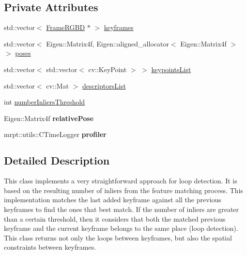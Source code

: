\subsection*{Private Attributes}
\begin{DoxyCompactItemize}
\item 
std::vector$<$ \hyperlink{class_frame_r_g_b_d}{FrameRGBD} $\ast$ $>$ \hyperlink{class_keyframe_loop_detector_a9fc839f91a21d9666dbf40610d2be7df}{keyframes}
\item 
std::vector$<$ Eigen::Matrix4f, Eigen::aligned\_\-allocator$<$ Eigen::Matrix4f $>$ $>$ \hyperlink{class_keyframe_loop_detector_a486f9714c66706b85febede7f3653676}{poses}
\item 
std::vector$<$ std::vector$<$ cv::KeyPoint $>$ $>$ \hyperlink{class_keyframe_loop_detector_aed3185bed2b9c9c1e342d155f370bc60}{keypointsList}
\item 
std::vector$<$ cv::Mat $>$ \hyperlink{class_keyframe_loop_detector_a523e7cacd0a93ce8bc5a55100c571bed}{descriptorsList}
\item 
int \hyperlink{class_keyframe_loop_detector_a88bfa794730e06898b2f9aede72f22ca}{numberInliersThreshold}
\item 
\hypertarget{class_keyframe_loop_detector_a86cd4a82b86a5ebdce90bccda946bcc2}{
Eigen::Matrix4f {\bfseries relativePose}}
\label{class_keyframe_loop_detector_a86cd4a82b86a5ebdce90bccda946bcc2}

\item 
\hypertarget{class_keyframe_loop_detector_a8b48f2156c77ecb7822365016454fb16}{
mrpt::utils::CTimeLogger {\bfseries profiler}}
\label{class_keyframe_loop_detector_a8b48f2156c77ecb7822365016454fb16}

\end{DoxyCompactItemize}


\subsection{Detailed Description}
This class implements a very straightforward approach for loop detection. It is based on the resulting number of inliers from the feature matching process. This implementation matches the last added keyframe against all the previous keyframes to find the ones that best match. If the number of inliers are greater than a certain threshold, then it considers that both the matched previous keyframe and the current keyframe belongs to the same place (loop detection). This class returns not only the loops between keyframes, but also the spatial constraints between keyframes. 

